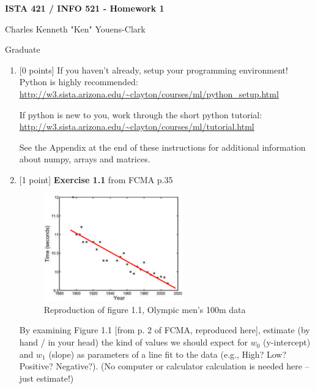 \documentclass[10pt]{article}
\begin{document}
\begin{center}
    {\Large {\bf ISTA 421 / INFO 521 - Homework 1}} \\
\end{center}

\begin{flushright}
Charles Kenneth "Ken" Youens-Clark

Graduate 
\end{flushright}

\vspace{1cm}

\begin{enumerate}

\item \label{prob:1} [0 points]
If you haven't already, setup your programming environment!  Python is highly recommended:\\
\url{http://w3.sista.arizona.edu/~clayton/courses/ml/python_setup.html}

If python is new to you, work through the short python tutorial:\\
\url{http://w3.sista.arizona.edu/~clayton/courses/ml/tutorial.html}

See the Appendix at the end of these instructions for additional information about numpy, arrays and matrices.

\item \label{prob:2} [1 point]
{\bf Exercise 1.1} from FCMA p.35

\begin{figure}[htb]
\begin{center}
\includegraphics[width=6cm]{figures/figure1-1_p2}
\caption{Reproduction of figure 1.1, Olympic men's 100m data}
\end{center}
\end{figure}
By examining Figure 1.1 [from p. 2 of FCMA, reproduced here], estimate (by hand / in your head) the kind of values we should expect for $w_0$ (y-intercept) and $w_1$ (slope) as parameters of a line fit to the data (e.g., High? Low?  Positive?  Negative?).  (No computer or calculator calculation is needed here -- just estimate!)


\end{enumerate}
\end{document}
